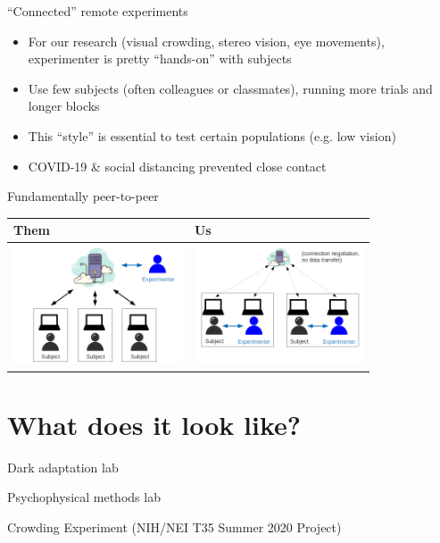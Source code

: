 \documentclass[10pt]{beamer}
\begin{document}
\begin{frame}{``Connected'' remote experiments}
	\begin{itemize}[<+->]
        \item For our research (visual crowding, stereo vision, eye movements), experimenter is pretty ``hands-on'' with subjects
        \item Use few subjects (often colleagues or classmates), running more trials and longer blocks
        \item This ``style'' is essential to test certain populations (e.g. low vision)
        \item COVID-19 \& social distancing prevented close contact
    \end{itemize}
\end{frame}

\begin{frame}{Fundamentally peer-to-peer}
    \begin{tabular}{l|l}
        Them & Us \\
        \hline
	{\hfill\includegraphics[width=5cm]{../doc/clouds_openloop.png}}   &
	{\hfill\includegraphics[width=5cm]{../doc/pairs.png}}   \\
	\end{tabular}
\end{frame}


\section{What does it look like?}
\begin{frame}{Dark adaptation lab}
    \begin{center}
    \end{center}
\end{frame}
\begin{frame}{Psychophysical methods lab}
    \begin{center}
    \end{center}
\end{frame}
\begin{frame}{Crowding Experiment (NIH/NEI T35 Summer 2020 Project)}
    \begin{center}
    \end{center}
\end{frame}
\end{document}
